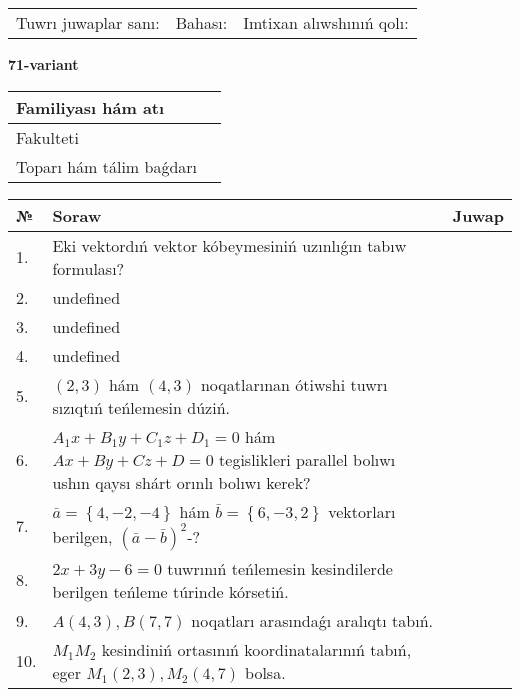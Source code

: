 \documentclass{article}
\begin{document}
\vspace{0.7cm}

\begin{tabular}{lll}
Tuwrı juwaplar sanı: \underline{\hspace{1cm}} & 
Bahası: \underline{\hspace{1cm}} & 
Imtixan alıwshınıń qolı: \underline{\hspace{2cm}} \\
\end{tabular}

\egroup

\newpage


\textbf{71-variant}\\

\bgroup
\def\arraystretch{1.6} %

\begin{tabular}{|m{5.7cm}|m{9.5cm}|}
\hline
Familiyası hám atı & \\
\hline
Fakulteti  & \\
\hline
Toparı hám tálim baǵdarı  & \\
\hline
\end{tabular}

\vspace{0.7cm}

\begin{tabular}{|m{0.7cm}|m{10cm}|m{4cm}|}
\hline
№ & Soraw & Juwap \\
\hline
1. & Eki vektordıń vektor kóbeymesiniń uzınlıǵın tabıw formulası? &  \\
\hline
2. & undefined &  \\
\hline
3. & undefined &  \\
\hline
4. & undefined &  \\
\hline
5. & $(2, 3)$ hám $(4, 3)$ noqatlarınan ótiwshi tuwrı sızıqtıń teńlemesin dúziń. &  \\
\hline
6. & \(A_{1}x + B_{1}y + C_{1}z + D_{1} = 0\) hám \(Ax + By + Cz + D = 0\) tegislikleri parallel bolıwı ushın qaysı shárt orınlı bolıwı kerek? &  \\
\hline
7. & \(\bar{a} = \left\{ 4,- 2,- 4 \right\}\) hám \(\bar{b} = \left\{ 6,- 3, 2 \right\}\) vektorları berilgen, \((\bar{a} - \bar{b}) ^{2}\)-? &  \\
\hline
8. & \(2 x + 3 y - 6 = 0\) tuwrınıń teńlemesin kesindilerde berilgen teńleme túrinde kórsetiń. &  \\
\hline
9. & \(A (4, 3), B (7, 7)\) noqatları arasındaǵı aralıqtı tabıń. &  \\
\hline
10. & \(M_{1}M_{2}\) kesindiniń ortasınıń koordinatalarınıń tabıń, eger \(M_{1} (2, 3), M_{2} (4, 7)\) bolsa. & \\
\hline
\end{tabular}
\end{document}
